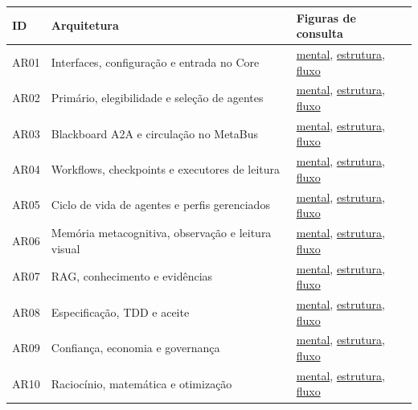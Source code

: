 {\small\begin{longtable}{p{1cm}p{7.2cm}p{5.5cm}}

\toprule ID & Arquitetura & Figuras de consulta \\ \midrule\endhead

AR01 & Interfaces, configuração e entrada no Core & \hyperref[fig:AR01-mental]{mental}, \hyperref[fig:AR01-structure]{estrutura}, \hyperref[fig:AR01-flow]{fluxo} \\

AR02 & Primário, elegibilidade e seleção de agentes & \hyperref[fig:AR02-mental]{mental}, \hyperref[fig:AR02-structure]{estrutura}, \hyperref[fig:AR02-flow]{fluxo} \\

AR03 & Blackboard A2A e circulação no MetaBus & \hyperref[fig:AR03-mental]{mental}, \hyperref[fig:AR03-structure]{estrutura}, \hyperref[fig:AR03-flow]{fluxo} \\

AR04 & Workflows, checkpoints e executores de leitura & \hyperref[fig:AR04-mental]{mental}, \hyperref[fig:AR04-structure]{estrutura}, \hyperref[fig:AR04-flow]{fluxo} \\

AR05 & Ciclo de vida de agentes e perfis gerenciados & \hyperref[fig:AR05-mental]{mental}, \hyperref[fig:AR05-structure]{estrutura}, \hyperref[fig:AR05-flow]{fluxo} \\

AR06 & Memória metacognitiva, observação e leitura visual & \hyperref[fig:AR06-mental]{mental}, \hyperref[fig:AR06-structure]{estrutura}, \hyperref[fig:AR06-flow]{fluxo} \\

AR07 & RAG, conhecimento e evidências & \hyperref[fig:AR07-mental]{mental}, \hyperref[fig:AR07-structure]{estrutura}, \hyperref[fig:AR07-flow]{fluxo} \\

AR08 & Especificação, TDD e aceite & \hyperref[fig:AR08-mental]{mental}, \hyperref[fig:AR08-structure]{estrutura}, \hyperref[fig:AR08-flow]{fluxo} \\

AR09 & Confiança, economia e governança & \hyperref[fig:AR09-mental]{mental}, \hyperref[fig:AR09-structure]{estrutura}, \hyperref[fig:AR09-flow]{fluxo} \\

AR10 & Raciocínio, matemática e otimização & \hyperref[fig:AR10-mental]{mental}, \hyperref[fig:AR10-structure]{estrutura}, \hyperref[fig:AR10-flow]{fluxo} \\


\end{longtable}}
